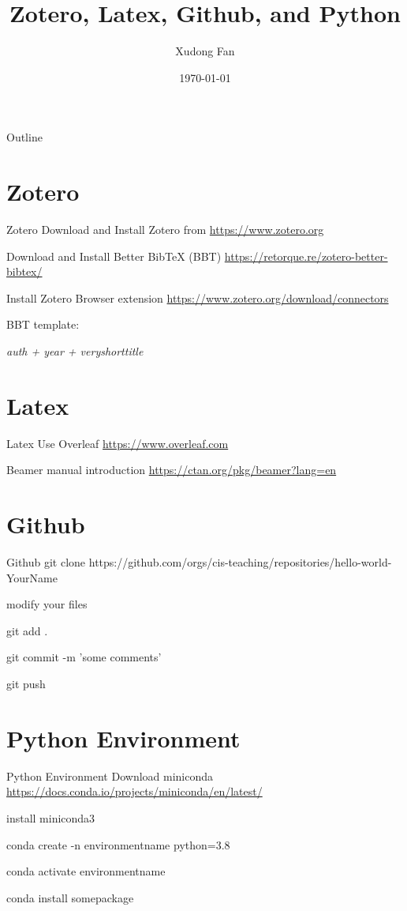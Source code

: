 \documentclass{beamer}
\title{Zotero, Latex, Github, and Python}
\author{Xudong Fan}
\date{\today}
\begin{document}
\begin{frame}
    \titlepage
\end{frame}

\logo{}


\begin{frame}{Outline}
    \tableofcontents
\end{frame}

\section{Zotero}
\begin{frame}{Zotero}
    Download and Install Zotero from \url{https://www.zotero.org}

    Download and Install Better BibTeX (BBT) \url{https://retorque.re/zotero-better-bibtex/}

    Install Zotero Browser extension \url{https://www.zotero.org/download/connectors}

    BBT template:

    \em{auth + year + veryshorttitle}

\end{frame}

\section{Latex}
\begin{frame}{Latex}
    Use Overleaf \url{https://www.overleaf.com}

    Beamer manual introduction \url{https://ctan.org/pkg/beamer?lang=en}

\end{frame}

\section{Github}
\begin{frame}{Github}
    git clone {https://github.com/orgs/cis-teaching/repositories/hello-world-YourName}

    modify your files

    git add .

    git commit -m 'some comments'

    git push
\end{frame}

\section{Python Environment}
\begin{frame}{Python Environment}
    Download miniconda \url{https://docs.conda.io/projects/miniconda/en/latest/}

    install miniconda3

    conda create -n environmentname python=3.8

    conda activate environmentname

    conda install somepackage

\end{frame}
\end{document}
